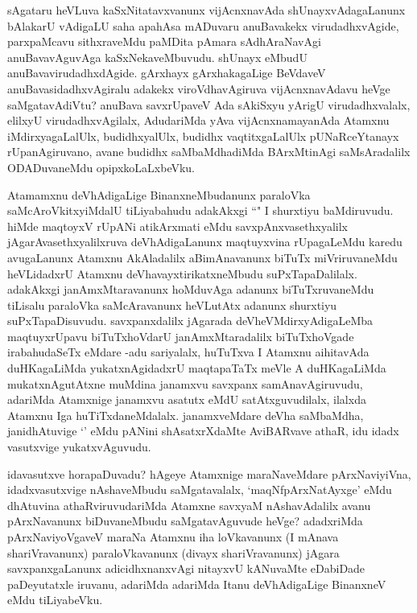 \begin{artha}
sAgataru heVLuva kaSxNitatavxvanunx vijAcnxnavAda shUnayxvAdagaLanunx bAlakarU vAdigaLU saha apahAsa mADuvaru anuBavakekx virudadhxvAgide, parxpaMcavu sithxraveMdu paMDita pAmara sAdhAraNavAgi anuBavavAguvAga kaSxNekaveMbuvudu. shUnayx eMbudU anuBavavirudadhxdAgide. gArxhayx gArxhakagaLige BeVdaveV anuBavasidadhxvAgiralu adakekx viroVdhavAgiruva vijAcnxnavAdavu heVge saMgatavAdiVtu? anuBava savxrUpaveV Ada sAkiSxyu yArigU virudadhxvalalx, elilxyU virudadhxvAgilalx, AdudariMda yAva vijAcnxnamayanAda Atamxnu iMdirxyagaLalUlx, budidhxyalUlx, budidhx vaqtitxgaLalUlx pUNaRceYtanayx rUpanAgiruvano, avane budidhx saMbaMdhadiMda BArxMtinAgi saMsAradalilx ODADuvaneMdu opipxkoLaLxbeVku. 
\end{artha}%

\begin{artha}
Atamamxnu deVhAdigaLige BinanxneMbudanunx paraloVka saMcAroVkitxyiMdalU tiLiyabahudu adakAkxgi ``\stext " I shurxtiyu baMdiruvudu. hiMde maqtoyxV rUpANi atikArxmati eMdu savxpAnxvasethxyalilx jAgarAvasethxyalilxruva deVhAdigaLanunx maqtuyxvina rUpagaLeMdu karedu avugaLanunx Atamxnu AkAladalilx aBimAnavanunx biTuTx miVriruvaneMdu heVLidadxrU Atamxnu deVhavayxtirikatxneMbudu suPxTapaDalilalx. adakAkxgi janAmxMtaravanunx hoMduvAga adanunx biTuTxruvaneMdu tiLisalu paraloVka saMcAravanunx heVLutAtx adanunx shurxtiyu suPxTapaDisuvudu. savxpanxdalilx jAgarada deVheVMdirxyAdigaLeMba maqtuyxrUpavu biTuTxhoVdarU janAmxMtaradalilx biTuTxhoVgade irabahudaSeTx eMdare -adu sariyalalx, huTuTxva I Atamxnu aihitavAda duHKagaLiMda yukatxnAgidadxrU maqtapaTaTx meVle A duHKagaLiMda mukatxnAgutAtxne muMdina janamxvu savxpanx samAnavAgiruvudu, adariMda Atamxnige janamxvu asatutx eMdU satAtxguvudilalx, ilalxda Atamxnu Iga huTiTxdaneMdalalx. janamxveMdare deVha saMbaMdha, janidhAtuvige `\stext ' eMdu pANini shAsatxrXdaMte AviBARvave athaR, idu idadx vasutxvige yukatxvAguvudu. 
\end{artha}%

\begin{artha}
idavasutxve horapaDuvadu? hAgeye Atamxnige maraNaveMdare pArxNaviyiVna, idadxvasutxvige nAshaveMbudu saMgatavalalx, `maqNfpArxNatAyxge' eMdu dhAtuvina athaRviruvudariMda Atamxne savxyaM nAshavAdalilx avanu pArxNavanunx biDuvaneMbudu saMgatavAguvude heVge? adadxriMda pArxNaviyoVgaveV maraNa Atamxnu iha loVkavanunx (I mAnava shariVravanunx) paraloVkavanunx (divayx shariVravanunx) jAgara savxpanxgaLanunx adicidhxnanxvAgi nitayxvU kANuvaMte eDabiDade paDeyutatxle iruvanu, adariMda adariMda Itanu deVhAdigaLige BinanxneV eMdu tiLiyabeVku. 
\end{artha}

